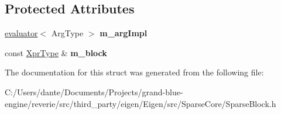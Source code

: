 \subsection*{Protected Attributes}
\begin{DoxyCompactItemize}
\item 
\mbox{\label{struct_eigen_1_1internal_1_1unary__evaluator_3_01_block_3_01_arg_type_00_01_block_rows_00_01_blodb73497179e7c432f93b3052e2754983_a7bce0ea2705db61efb1d55c086837236}} 
\mbox{\hyperlink{struct_eigen_1_1internal_1_1evaluator}{evaluator}}$<$ Arg\+Type $>$ {\bfseries m\+\_\+arg\+Impl}
\item 
\mbox{\label{struct_eigen_1_1internal_1_1unary__evaluator_3_01_block_3_01_arg_type_00_01_block_rows_00_01_blodb73497179e7c432f93b3052e2754983_a7fe6d200d82df7b7f586e12753265592}} 
const \mbox{\hyperlink{class_eigen_1_1_block}{Xpr\+Type}} \& {\bfseries m\+\_\+block}
\end{DoxyCompactItemize}


The documentation for this struct was generated from the following file\+:\begin{DoxyCompactItemize}
\item 
C\+:/\+Users/dante/\+Documents/\+Projects/grand-\/blue-\/engine/reverie/src/third\+\_\+party/eigen/\+Eigen/src/\+Sparse\+Core/Sparse\+Block.\+h\end{DoxyCompactItemize}
